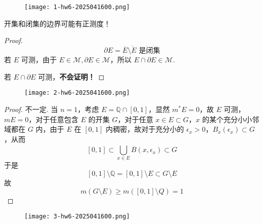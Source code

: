 \begin{exercise}
\begin{figure}[H]
\centering
\texttt{[image: 1-hw6-2025041600.png]}
\label{}
\end{figure}
\end{exercise}
\begin{note}
开集和闭集的边界可能有正测度！
\end{note}
\begin{proof}
\[
\partial E=\overline{E}\setminus\mathring{E}\text{ 是闭集}
\]
若 $E$ 可测，由于 $E\in \mathcal{M},\partial E\in \mathcal{M}$，所以 $E\cap \partial E\in \mathcal{M}$.

若 $E\cap \partial E$ 可测，\textbf{不会证明！}

\end{proof}

\begin{exercise}
\begin{figure}[H]
\centering
\texttt{[image: 2-hw6-2025041600.png]}
\label{}
\end{figure}
\end{exercise}
\begin{proof}
不一定. 当 $n=1$，考虑 $E=\mathbb{Q}\cap[0,1]$，显然 $m^{*}E=0$，故 $E$ 可测，$mE=0$，对于任意包含 $E$ 的开集 $G$，对于任意 $x\in E\subset G$，$x$ 的某个充分小小邻域都在 $G$ 内，由于 $E$ 在 $[0,1]$ 内稠密，故对于充分小的 $\epsilon_{x}>0$，$B_{x}(\epsilon_{x})\subset G$，从而
\[
[0,1]\subset \bigcup_{x\in E}^{}B(x,\epsilon_{x})\subset G
\]
于是
\[
[0,1]\setminus \mathbb{Q}=[0,1]\setminus E\subset G\setminus E
\]
故
\[
m(G\setminus E)\geq m([0,1]\setminus Q)=1
\]
\end{proof}

\begin{exercise}
\begin{figure}[H]
\centering
\texttt{[image: 3-hw6-2025041600.png]}
\label{}
\end{figure}\label{5c15b8}
\end{exercise}

